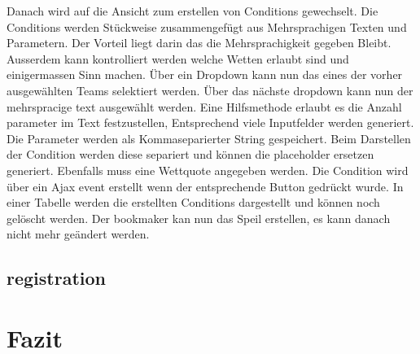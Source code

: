 \documentclass[a4paper, abstracton]{scrartcl}
\begin{document}
  Danach wird auf die Ansicht zum erstellen von Conditions gewechselt.
  Die Conditions werden Stückweise zusammengefügt aus Mehrsprachigen Texten und
  Parametern. Der Vorteil liegt darin das die Mehrsprachigkeit gegeben Bleibt.
  Ausserdem kann kontrolliert werden welche Wetten erlaubt sind und einigermassen
  Sinn machen.
  Über ein Dropdown kann nun das eines der vorher ausgewählten Teams selektiert
  werden. Über das nächste dropdown kann nun der mehrspracige text ausgewählt werden.
  Eine Hilfsmethode erlaubt es die Anzahl parameter im Text festzustellen,
  Entsprechend viele Inputfelder werden generiert. Die Parameter werden als
  Kommaseparierter String gespeichert. Beim Darstellen der Condition werden diese
  separiert und können die placeholder ersetzen generiert.
  Ebenfalls muss eine Wettquote angegeben werden.
  Die Condition wird über ein Ajax event erstellt wenn der entsprechende Button
  gedrückt wurde. In einer Tabelle werden die erstellten Conditions dargestellt
  und können noch gelöscht werden.
  Der bookmaker kan nun das Speil erstellen, es kann danach nicht mehr geändert werden.
  

\subsection{registration}

\section{Fazit}


\pagebreak
\listoffigures		%

\pagebreak	%


\pagebreak


\pagebreak	
\end{document}
